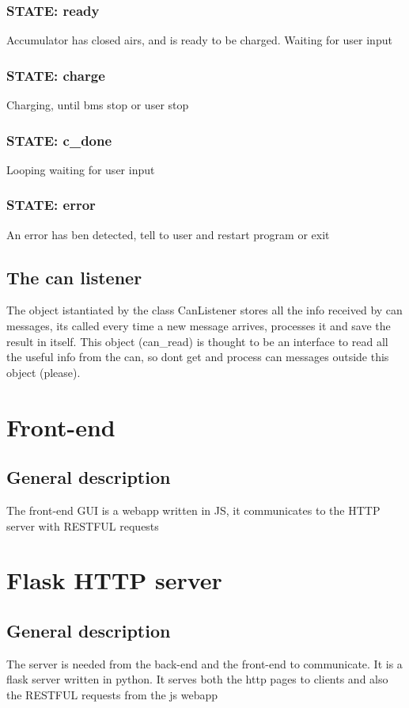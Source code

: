 \documentclass[a4paper]{report}
\begin{document}
  \subsection{STATE: ready}
  Accumulator has closed airs, and is ready to be charged. Waiting for user input
  \subsection{STATE: charge}
  Charging, until bms stop or user stop
  \subsection{STATE: c\_done}
  Looping waiting for user input
  \subsection{STATE: error}
  An error has ben detected, tell to user and restart program or exit

  \section{The can listener}
  The object istantiated by the class CanListener stores all the info received by can messages, its called every time a new message arrives, processes it and save the result in itself. This object (can\_read) is thought to be an interface to read all the useful info from the can, so dont get and process can messages outside this object (please).

  \chapter{Front-end}
  \section{General description}
  The front-end GUI is a webapp written in JS, it communicates to the HTTP server with RESTFUL requests

  \chapter{Flask HTTP server}
  \section{General description}
  The server is needed from the back-end and the front-end to communicate. It is a flask server written in python. It serves both the http pages to clients and also the RESTFUL requests from the js webapp
\end{document}
